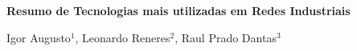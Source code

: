 \begin{center}




\textbf{Resumo de Tecnologias mais utilizadas em Redes Industriais}\vspace{0.5cm}

Igor Augusto$^1$, 
Leonardo Reneres$^2$, 
Raul Prado Dantas$^3$











\end{center}

  
  
  
  


